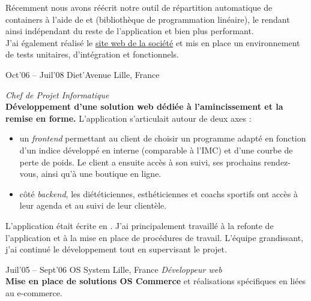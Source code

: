 \documentclass[print]{cv} %
\begin{document}
\begin{entrylist}
{Récemment nous avons réécrit notre outil de répartition automatique de containers à l'aide de  et  (bibliothèque de programmation linéaire), le rendant ainsi indépendant du reste de l'application et bien plus performant.
\vspace{5pt}\\
J'ai également réalisé le \href{http://www.geniustrade.com}{site web de la société} et mis en place un environnement de tests unitaires, d'intégration et fonctionnels.
}
\end{entrylist}

\begin{entrylist}
\entry
{Oct'06 – Juil'08}
{Diet'Avenue}
{Lille, France}
{\emph{Chef de Projet Informatique}
\vspace{5pt}\\
\textbf{Développement d'une solution web dédiée à l'amincissement et la remise en forme.} L'application s'articulait autour de deux axes :
\begin{itemize}
\item un \emph{frontend} permettant au client de choisir un programme adapté en fonction d'un indice développé en interne (comparable à l'IMC) et d'une courbe de perte de poids. Le client a ensuite accès à son suivi, ses prochains rendez-vous, ainsi qu'à une boutique en ligne.
\item côté \emph{backend}, les diététiciennes, esthéticiennes et coachs sportifs ont accès à leur agenda et au suivi de leur clientèle. 
\end{itemize}
\vspace{5pt}
L'application était écrite en . J'ai principalement travaillé à la refonte de l'application et à la mise en place de procédures de travail. L'équipe grandissant, j'ai continué le développement tout en supervisant le projet.
}
\entry
{Juil'05 – Sept'06}
{OS System}
{Lille, France}
{\emph{Développeur web}
\vspace{5pt}\\
\textbf{Mise en place de solutions OS Commerce} et réalisations spécifiques en  liées au e-commerce.}
\end{entrylist}

\par\vspace{5\parskip}
\end{document}
